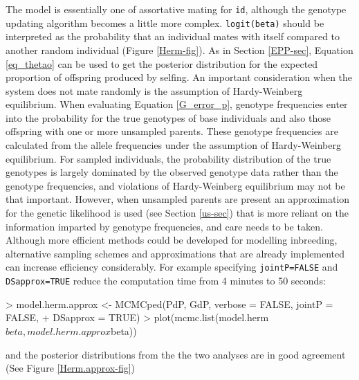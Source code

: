 \documentclass{article}
\begin{document}
The model is essentially one of assortative mating for \texttt{id}, although the genotype updating algorithm becomes a little more complex.  \texttt{logit(beta)} should be interpreted as the probability that an individual mates with itself compared to another random individual (Figure \ref{Herm-fig}).  As in Section \ref{EPP-sec}, Equation \ref{eq_thetao} can be used to get the posterior distribution for the expected proportion of offspring produced by selfing.  An important consideration when the system does not mate randomly is the assumption of Hardy-Weinberg equilibrium.  When evaluating Equation \ref{G_error_p}, genotype frequencies enter into the probability for the true genotypes of base individuals and also those offspring with one or more unsampled parents. These genotype frequencies are calculated from the allele frequencies under the assumption of Hardy-Weinberg equilibrium. For sampled individuals, the probability distribution of the true genotypes is largely dominated by the observed genotype data rather than the genotype frequencies, and violations of Hardy-Weinberg equilibrium may not be that important.  However, when unsampled parents are present an approximation for the genetic likelihood is used (see Section \ref{us-sec}) that is more reliant on the information imparted by genotype frequencies, and care needs to be taken.\\


Although more efficient methods could be developed for modelling inbreeding, alternative sampling schemes and approximations that are already implemented can increase efficiency considerably.  For example specifying \texttt{jointP=FALSE} and \texttt{DSapprox=TRUE} reduce the computation time from 4 minutes to 50 seconds:

\begin{Schunk}
\begin{Sinput}
> model.herm.approx <- MCMCped(PdP, GdP, verbose = FALSE, jointP = FALSE, 
+     DSapprox = TRUE)
> plot(mcmc.list(model.herm$beta, model.herm.approx$beta))
\end{Sinput}
\end{Schunk}

and the posterior distributions from the the two analyses are in good agreement (See Figure \ref{Herm.approx-fig})
\end{document}
